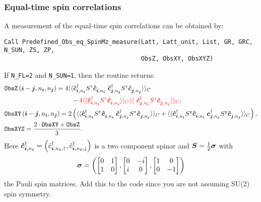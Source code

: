 \subsubsection{Equal-time spin correlations}

A measurement of the equal-time spin correlations can be obtained by:
\begin{lstlisting}[style=fortran]
Call Predefined_Obs_eq_SpinMz_measure(Latt, Latt_unit, List, GR, GRC, N_SUN, ZS, ZP,
                                      ObsZ, ObsXY, ObsXYZ)
\end{lstlisting}
If \texttt{N\_FL=2} and \texttt{N\_SUN=1}, then the routine returns:
\begin{align}
&\texttt{ObsZ}\left(\ve{i}-\ve{j}, n_{\ve{i}},  n_{\ve{j}} \right)  =  \begin{multlined}[t]  4 \langle \langle \ve{\hat{c}}^{\dagger}_{\ve{i}, n_{\ve{i}}} S^z \ve{\hat{c}}^{\phantom\dagger}_{\ve{i}, n_{\ve{i}} }   \;  \ve{\hat{c}}^{\dagger}_{\ve{j}, n_{\ve{j}}} S^z  \ve{\hat{c}}^{\phantom\dagger}_{\ve{j}, n_{\ve{j}}}\rangle \rangle_{C} \\
-   {\color{red} 4 \langle \langle \ve{\hat{c}}^{\dagger}_{\ve{i}, n_{\ve{i}}} S^z \ve{\hat{c}}^{\phantom\dagger}_{\ve{i}, n_{\ve{i}} } \rangle \rangle_{C}  \langle \langle \  \ve{\hat{c}}^{\dagger}_{\ve{j}, n_{\ve{j}}} S^z  \ve{\hat{c}}^{\phantom\dagger}_{\ve{j}, n_{\ve{j}}}\rangle \rangle_{C} },  \end{multlined} \nonumber \\  
&\texttt{ObsXY}\left(\ve{i}-\ve{j}, n_{\ve{i}},  n_{\ve{j}} \right)  =  2 \left( \langle \langle \ve{\hat{c}}^{\dagger}_{\ve{i}, n_{\ve{i}}} S^x \ve{\hat{c}}^{\phantom\dagger}_{\ve{i}, n_{\ve{i}} }   \;  \ve{\hat{c}}^{\dagger}_{\ve{j}, n_{\ve{j}}} S^x  
\ve{\hat{c}}^{\phantom\dagger}_{\ve{j}, n_{\ve{j}}}\rangle \rangle_{C}  +
\langle \langle \ve{\hat{c}}^{\dagger}_{\ve{i}, n_{\ve{i}}} S^y \ve{\hat{c}}^{\phantom\dagger}_{\ve{i}, n_{\ve{i}} }   \;  \ve{c}^{\dagger}_{\ve{j}, n_{\ve{j}}} S^y  \ve{\hat{c}}^{\phantom\dagger}_{\ve{j}, n_{\ve{j}}}\rangle \rangle_{C}  \right), \nonumber \\
&\texttt{ObsXYZ} =  \frac{2\cdot\texttt{ObsXY} + \texttt{ObsZ}}{3}.
\end{align}
Here  $\boldsymbol{\hat{c}}^{\dagger}_{\boldsymbol{i}, n_{\boldsymbol{i}}} =  \left( \hat{c}^{\dagger}_{\boldsymbol{i}, n_{\boldsymbol{i}},\uparrow},  \hat{c}^{\dagger}_{\boldsymbol{i}, n_{\boldsymbol{i}},\downarrow} \right) $ is a two  component spinor  and    $ \boldsymbol{S}  = \frac{1}{2} \boldsymbol{\sigma}$  
with
\begin{equation}
\boldsymbol{\sigma}   = \left(
\begin{bmatrix} 
0 & 1 \\
1 & 0 
\end{bmatrix},
\begin{bmatrix} 
0 & -i \\
i & 0 
\end{bmatrix},
\begin{bmatrix} 
1 & 0 \\
0 & -1 
\end{bmatrix}
\right) \label{eq:vecPaulimat}
 \end{equation}
 the Pauli spin  matrices. 
 {\color{red}  Add this to the code since you are not assuming SU(2) spin symmetry.}

